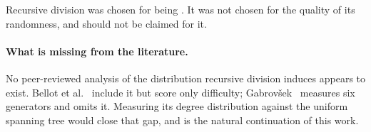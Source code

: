 \begin{keypoint}
Recursive division was chosen for being . It was not chosen for the quality of
its randomness, and should not be claimed for it.
\end{keypoint}

\paragraph{What is missing from the literature.}
No peer-reviewed analysis of the distribution recursive division induces appears
to exist. Bellot et al.~\cite{bellot2021how} include it but score only
difficulty; Gabrov\v{s}ek~\cite{gabrovsek2019analysis} measures six generators
and omits it. Measuring its degree distribution against the uniform spanning
tree would close that gap, and is the natural continuation of this work.
